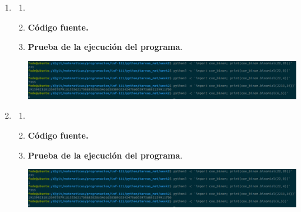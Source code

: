 \begin{enumerate}
\newpage

\item

    \begin{enumerate}[\bfseries a)]

	\item

	\item \textbf{Código fuente.}\\ 
	    
	    
	    \vspace{3cm}
	
	\item \textbf{Prueba de la ejecución del programa}.\\
	    \begin{center}
		\includegraphics[scale=.35]{imagenes/tareas_mat/week2/coe_binom.png}
	    \end{center}

    \end{enumerate}

\newpage

\item

    \begin{enumerate}[\bfseries a)]

	\item

	\item \textbf{Código fuente.}\\ 
	    
	    
	    \vspace{3cm}
	
	\item \textbf{Prueba de la ejecución del programa}.\\
	    \begin{center}
		\includegraphics[scale=.35]{imagenes/tareas_mat/week2/coe_binom.png}
	    \end{center}

    \end{enumerate}

\newpage
\end{enumerate}
